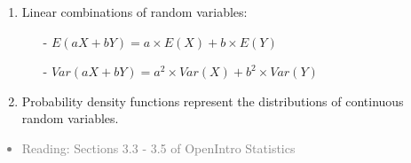 \documentclass[11pt]{article}
\newcommand{\gray}[1]{\textcolor{gray}{#1}}
\begin{document}
\begin{enumerate}[resume]
\item Linear combinations of random variables:
\begin{itemize}
\item[-] $E(aX + bY) = a \times E(X) + b \times E(Y)$
\item[-] $Var(aX + bY) = a^2 \times Var(X) + b^2 \times Var(Y)$
\end{itemize}

\item Probability density functions represent the distributions of continuous random variables.

\end{enumerate}

\gray{
{\it
\vspace{-0.75cm}
\begin{itemize}
\renewcommand{\labelitemi}{{\textcolor{dark}{$\ast$}}}
\item Reading: Sections 3.3 - 3.5 of OpenIntro Statistics
\end{itemize}
}}
\end{document}
